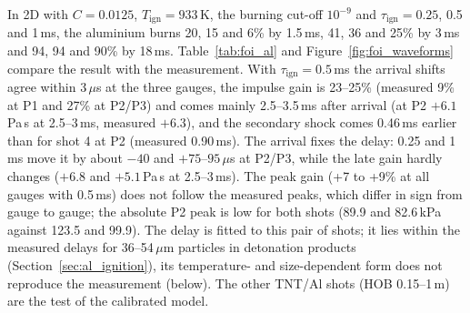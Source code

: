 \documentclass{article}
\begin{document}
In 2D with $C = 0.0125$, $T_\text{ign} = 933$\,K, the burning cut-off $10^{-9}$ and $\tau_\text{ign} = 0.25$, 0.5 and 1\,ms, the aluminium burns 20, 15 and 6\% by 1.5\,ms, 41, 36 and 25\% by 3\,ms and 94, 94 and 90\% by 18\,ms. Table~\ref{tab:foi_al} and Figure~\ref{fig:foi_waveforms} compare the result with the measurement. With $\tau_\text{ign} = 0.5$\,ms the arrival shifts agree within 3\,$\mu$s at the three gauges, the impulse gain is 23--25\% (measured 9\% at P1 and 27\% at P2/P3) and comes mainly 2.5--3.5\,ms after arrival (at P2 $+6.1$\,Pa\,s at 2.5--3\,ms, measured $+6.3$), and the secondary shock comes 0.46\,ms earlier than for shot 4 at P2 (measured 0.90\,ms). The arrival fixes the delay: 0.25 and 1\,ms move it by about $-40$ and $+75$--$95$\,$\mu$s at P2/P3, while the late gain hardly changes ($+6.8$ and $+5.1$\,Pa\,s at 2.5--3\,ms). The peak gain (+7 to +9\% at all gauges with 0.5\,ms) does not follow the measured peaks, which differ in sign from gauge to gauge; the absolute P2 peak is low for both shots (89.9 and 82.6\,kPa against 123.5 and 99.9). The delay is fitted to this pair of shots; it lies within the measured delays for 36--54\,$\mu$m particles in detonation products (Section~\ref{sec:al_ignition}), its temperature- and size-dependent form does not reproduce the measurement (below). The other TNT/Al shots (HOB 0.15--1\,m) are the test of the calibrated model.
\end{document}
